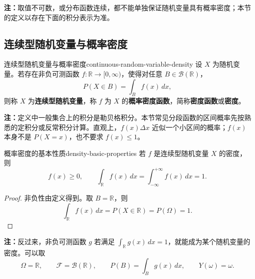 \textbf{注：}\quad 取值不可数，或分布函数连续，都不能单独保证随机变量具有概率密度；本节的定义以存在下面的积分表示为准。

\subsection*{连续型随机变量与概率密度}

\begin{mydefinition}{连续型随机变量与概率密度}{continuous-random-variable-density}
设 $X$ 为随机变量。若存在非负可测函数 $f:\mathbb R\to[0,\infty)$，使得对任意 $B\in\mathscr B(\mathbb R)$，
\[
P(X\in B)=\int_B f(x)\,dx,
\]
则称 $X$ 为\textbf{连续型随机变量}，称 $f$ 为 $X$ 的\textbf{概率密度函数}，简称\textbf{密度函数}或\textbf{密度}。
\end{mydefinition}

\textbf{注：}\quad 定义中一般集合上的积分是勒贝格积分。本节常见分段函数的区间概率先按熟悉的定积分或反常积分计算。直观上，$f(x)\Delta x$ 近似一个小区间的概率；$f(x)$ 本身不是 $P(X=x)$，也不要求 $f(x)\leq1$。

\begin{proposition}{概率密度的基本性质}{density-basic-properties}
若 $f$ 是连续型随机变量 $X$ 的密度，则
\[
f(x)\geq0,\qquad
\int_{\mathbb R}f(x)\,dx
=\int_{-\infty}^{+\infty}f(x)\,dx=1.
\]
\end{proposition}

\begin{proof}
非负性由定义得到。取 $B=\mathbb R$，则
\[
\int_{\mathbb R}f(x)\,dx=P(X\in\mathbb R)=P(\Omega)=1.
\]
\end{proof}

\textbf{注：}\quad 反过来，非负可测函数 $g$ 若满足 $\int_{\mathbb R}g(x)\,dx=1$，就能成为某个随机变量的密度。可以取
\[
\Omega=\mathbb R,\qquad
\mathscr F=\mathscr B(\mathbb R),\qquad
P(B)=\int_Bg(x)\,dx,\qquad
Y(\omega)=\omega.
\]

